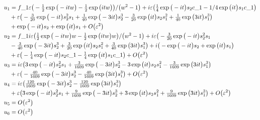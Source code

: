 \begin{align*}&
u_{1}=f\_1 \varepsilon \big(-\tfrac{1}{2} \exp \big(-i t w\big)-\tfrac{1}{2} \exp \big(i t w\big)
\big)/\big(w^{2}-1\big)+i \varepsilon \big(\tfrac{1}{4} \exp \big(-i t\big) s_{2} c\_1-1
/4 \exp \big(i t\big) s_{1} c\_1\big)
\\&\quad{}
+\varepsilon \big(-\tfrac{3}{20} \exp \big(-i t
\big) s_{2}^{2} s_{1}+\tfrac{1}{40} \exp \big(-3 i t\big) s_{2}^{3}-\tfrac{3}{20} \exp 
\big(i t\big) s_{2} s_{1}^{2}+\tfrac{1}{40} \exp \big(3 i t\big) s_{1}^{3}\big)
\\&\quad{}
+
\exp \big(-i t\big) s_{2}+\exp \big(i t\big) s_{1}+O\big(\varepsilon ^{2
}\big)
\\&{}
u_{2}=f\_1 i \varepsilon \big(\tfrac{1}{2} \exp \big(-i t w\big) w-\tfrac{1}{2} \exp \big(i t w
\big) w\big)/\big(w^{2}-1\big)+i \varepsilon \big(-\tfrac{3}{20} \exp \big(-i t\big) s_{
2}^{2} s_{1}
\\&\quad{}
-\tfrac{3}{40} \exp \big(-3 i t\big) s_{2}^{3}+\tfrac{3}{20} \exp \big(i t
\big) s_{2} s_{1}^{2}+\tfrac{3}{40} \exp \big(3 i t\big) s_{1}^{3}\big)+i \big(-
\exp \big(-i t\big) s_{2}+\exp \big(i t\big) s_{1}\big)
\\&\quad{}
+\varepsilon \big(-\tfrac{1}{4} 
\exp \big(-i t\big) s_{2} c\_1-\tfrac{1}{4} \exp \big(i t\big) s_{1} c\_1\big)+O
\big(\varepsilon ^{2}\big)
\\&{}
u_{3}=i \varepsilon \big(3 \exp \big(-i t\big) s_{2}^{2} s_{1}+\tfrac{3}{1609} \exp 
\big(-3 i t\big) s_{2}^{3}-3 \exp \big(i t\big) s_{2} s_{1}^{2}-\tfrac{3}{1609} 
\exp \big(3 i t\big) s_{1}^{3}\big)
\\&\quad{}
+\varepsilon \big(-\tfrac{40}{1609} \exp \big(-3 i t
\big) s_{2}^{3}-\tfrac{40}{1609} \exp \big(3 i t\big) s_{1}^{3}\big)+O\big(
\varepsilon ^{2}\big)
\\&{}
u_{4}=i \varepsilon \big(\tfrac{120}{1609} \exp \big(-3 i t\big) s_{2}^{3}-\tfrac{120}{1609} \exp
 \big(3 i t\big) s_{1}^{3}\big)
\\&\quad{}
+\varepsilon \big(3 \exp \big(-i t\big) s_{2}^{2
} s_{1}+\tfrac{9}{1609} \exp \big(-3 i t\big) s_{2}^{3}+3 \exp \big(i t\big) s_{2
} s_{1}^{2}+\tfrac{9}{1609} \exp \big(3 i t\big) s_{1}^{3}\big)+O\big(
\varepsilon ^{2}\big)
\\&{}
u_{5}=O\big(\varepsilon ^{2}\big)
\\&{}
u_{6}=O\big(\varepsilon ^{2}\big)
\end{align*}

